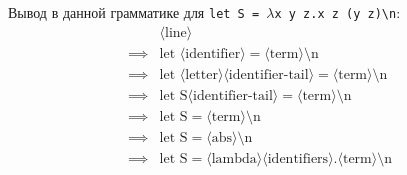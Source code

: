 \documentclass[12pt, a4paper, oneside]{memoir}
\begin{document}
Вывод в данной грамматике для \texttt{let S = $\lambda$x y z.x z (y z)\textbackslash n}:
\begin{align*}
               & \langle \text{line} \rangle                                                                                                                 \\
    \implies{} & \text{let } \langle \text{identifier} \rangle = \langle \text{term} \rangle \text{\textbackslash n}                                         \\
    \implies{} & \text{let } \langle \text{letter} \rangle \langle \text{identifier-tail} \rangle = \langle \text{term} \rangle \text{\textbackslash n}      \\
    \implies{} & \text{let } \text{S} \langle \text{identifier-tail} \rangle = \langle \text{term} \rangle \text{\textbackslash n}                           \\
    \implies{} & \text{let } \text{S} = \langle \text{term} \rangle \text{\textbackslash n}                                                                  \\
    \implies{} & \text{let } \text{S} = \langle \text{abs} \rangle \text{\textbackslash n}                                                                   \\
    \implies{} & \text{let } \text{S} = \langle \text{lambda} \rangle \langle \text{identifiers} \rangle.\langle \text{term} \rangle \text{\textbackslash n}
\end{align*}
\end{document}
